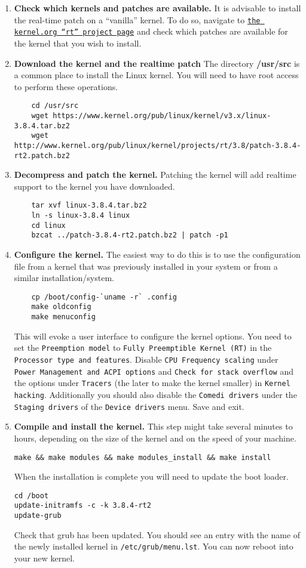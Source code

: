 \begin{enumerate}
\item \textbf{Check which kernels and patches are available.}
  It is advisable to install the real-time patch on a ``vanilla''
  kernel. To do so, navigate to
  \texttt{\href{http://www.kernel.org/pub/linux/kernel/projects/rt/}{the
      kernel.org ``rt'' project page}} and check which patches are
  available for the kernel that you wish to install. 
\item \textbf{Download the kernel and the realtime patch} The
  directory \textbf{/usr/src} is a common place to install the Linux
  kernel. You will need to have root access to perform these
  operations.
  \begin{lstlisting}
    cd /usr/src
    wget https://www.kernel.org/pub/linux/kernel/v3.x/linux-3.8.4.tar.bz2
    wget http://www.kernel.org/pub/linux/kernel/projects/rt/3.8/patch-3.8.4-rt2.patch.bz2
  \end{lstlisting}
\item \textbf{Decompress and patch the kernel.} Patching the kernel
  will add realtime support to the kernel you have downloaded.
  \begin{lstlisting}
    tar xvf linux-3.8.4.tar.bz2
    ln -s linux-3.8.4 linux
    cd linux
    bzcat ../patch-3.8.4-rt2.patch.bz2 | patch -p1
  \end{lstlisting}
\item \textbf{Configure the kernel.} The easiest way to do this is to
  use the configuration file from a kernel that was previously
  installed in your system or from a similar installation/system.
  \begin{lstlisting}
    cp /boot/config-`uname -r` .config
    make oldconfig
    make menuconfig
  \end{lstlisting}
  This will evoke a user interface to configure the kernel options.
You need to set the \texttt{Preemption model} to \texttt{Fully
  Preemptible Kernel (RT)} in the \texttt{Processor type and
  features}. Disable \texttt{CPU Frequency scaling} under
\texttt{Power Management and ACPI options} and \texttt{Check for
  stack overflow} and the options under \texttt{Tracers} (the later to
make the kernel smaller) in \texttt{Kernel hacking}. Additionally you
should also disable the \texttt{Comedi drivers} under the
\texttt{Staging drivers} of the \texttt{Device drivers} menu. Save and
exit.
\item \textbf{Compile and install the kernel.} This step might take several
  minutes to hours, depending on the size of the kernel and on the
  speed of your machine.
\begin{lstlisting}
make && make modules && make modules_install && make install
\end{lstlisting}
When the installation is complete you will need to update the boot loader.
\begin{lstlisting}
cd /boot
update-initramfs -c -k 3.8.4-rt2
update-grub
\end{lstlisting}
Check that grub has been updated. You should see an entry with the
name of the newly installed kernel in
\texttt{/etc/grub/menu.lst}. You can now reboot into your new kernel.
\end{enumerate}

